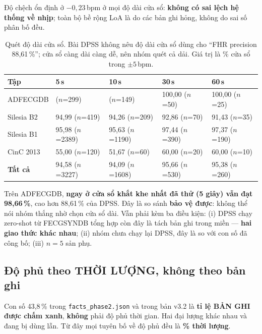 Độ chệch ổn định ở $-0{,}23$\,bpm ở mọi độ dài cửa sổ: \textbf{không có sai lệch hệ thống về nhịp};
toàn bộ bề rộng LoA là do các bản ghi hỏng, không do sai số phân bố đều.

\begin{table}[H]\centering\small
\caption{Quét độ dài cửa sổ. Bài DPSS không nêu độ dài cửa sổ dùng cho ``FHR precision 88,61\,\%'';
cửa sổ càng dài càng dễ, nên nhóm quét cả dải. Giá trị là \% cửa sổ trong $\pm5$\,bpm.}
\label{tab:fhr_quet}
\begin{tabular}{@{}L{3.6cm} C{2.4cm} C{2.4cm} C{2.4cm} C{2.4cm}@{}}
\toprule
\textbf{Tập} & \textbf{5\,s} & \textbf{10\,s} & \textbf{30\,s} & \textbf{60\,s} \\
\midrule
ADFECGDB &  ($n$=299) &  ($n$=149) & 100,00 ($n$=50) & 100,00 ($n$=25) \\
Silesia B2 & 94,99 ($n$=419) & 94,26 ($n$=209) & 92,86 ($n$=70) & 91,43 ($n$=35) \\
Silesia B1 & 95,98 ($n$=2389) & 95,63 ($n$=1190) & 97,44 ($n$=390) & 97,37 ($n$=190) \\
CinC 2013 & 55,00 ($n$=120) & 51,67 ($n$=60) & 60,00 ($n$=20) & 60,00 ($n$=10) \\
\midrule
\textbf{Tất cả} & 94,58 ($n$=3227) & 94,09 ($n$=1608) & 95,66 ($n$=530) & 95,38 ($n$=260) \\
\bottomrule
\end{tabular}
\end{table}

Trên ADFECGDB, \textbf{ngay ở cửa sổ khắt khe nhất đã thử (5 giây) vẫn đạt 98,66\,\%}, cao hơn 88,61\,\%
của DPSS. Đây là so sánh \textbf{bảo vệ được}: không thể nói nhóm thắng nhờ chọn cửa sổ dài. Vẫn phải
kèm ba điều kiện: (i) DPSS chạy zero-shot từ FECGSYNDB tổng hợp còn đây là tách bản ghi trong miền ---
\textbf{hai giao thức khác nhau}; (ii) nhóm chưa chạy lại DPSS, đây là so với con số đã công bố;
(iii) $n = 5$ sản phụ.

\subsection{Độ phủ theo THỜI LƯỢNG, không theo bản ghi}

\begin{canhbao}[title={Một cách gọi tên sai phải sửa}]
Con số 43,8\,\% trong \texttt{facts\_phase2.json} và trong bản v3.2 là \textbf{tỉ lệ BẢN GHI được chấm
xanh}, \textbf{không} phải độ phủ thời gian. Hai đại lượng khác nhau và đang bị dùng lẫn. Từ đây mọi
tuyên bố về độ phủ đều là \textbf{\% thời lượng}.
\end{canhbao}

